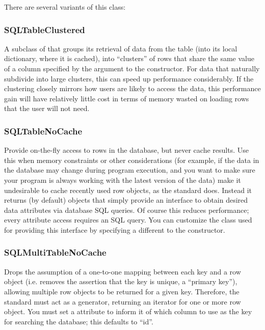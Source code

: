 \documentclass{howto}
\begin{document}
There are several variants of this class:
\subsubsection{SQLTableClustered}
A subclass of  that groups its retrieval
of data from the table (into its local dictionary, where it
is cached), into ``clusters'' of rows that share the same value of
a column specified by the  argument to the 
constructor.  For data that naturally subdivide into large clusters,
this can speed up performance considerably.  If the clustering
closely mirrors how users are likely to access the data, this
performance gain will have relatively little cost in terms
of memory wasted on loading rows that the user will not need.


\subsubsection{SQLTableNoCache}
Provide on-the-fly access to rows in the database, 
but never cache results.  Use this when memory constraints or other 
considerations (for example, if the data in the database may change
during program execution, and you want to make sure your program
is always working with the latest version of the data) 
make it undesirable to cache recently used row objects, as the
standard  does.  Instead it returns (by default)
 objects that simply provide an interface
to obtain desired data attributes via database SQL queries.
Of course this reduces performance; every attribute access
requires an SQL query.  You can customize the class used for
providing this interface by specifying a different 
to the constructor.

\subsubsection{SQLMultiTableNoCache}
Drops the assumption of a one-to-one
mapping between each key and a row object (i.e. removes the
assertion that the key is unique, a ``primary key''), allowing
multiple row objects to be returned for a given key.  Therefore,
the standard  must act as a generator, returning
an iterator for one or more row object.  You must set a 
 attribute to inform it of which 
column to use as the key for searching the database;
this defaults to ``id''.
\end{document}
